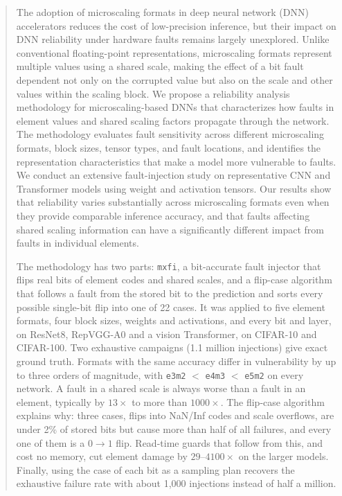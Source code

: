 \documentclass[12pt,a4paper]{article}
\newcommand{\fmt}[1]{\texttt{#1}}
\begin{document}
\newpage
\begin{abstract}
\noindent
The adoption of microscaling formats in deep neural network (DNN) accelerators reduces the
cost of low-precision inference, but their impact on DNN reliability under hardware faults
remains largely unexplored. Unlike conventional floating-point representations, microscaling
formats represent multiple values using a shared scale, making the effect of a bit fault
dependent not only on the corrupted value but also on the scale and other values within the
scaling block. We propose a reliability analysis methodology for microscaling-based DNNs that
characterizes how faults in element values and shared scaling factors propagate through the
network. The methodology evaluates fault sensitivity across different microscaling formats,
block sizes, tensor types, and fault locations, and identifies the representation
characteristics that make a model more vulnerable to faults. We conduct an extensive
fault-injection study on representative CNN and Transformer models using weight and activation
tensors. Our results show that reliability varies substantially across microscaling formats
even when they provide comparable inference accuracy, and that faults affecting shared scaling
information can have a significantly different impact from faults in individual elements.

The methodology has two parts: \texttt{mxfi}, a bit-accurate fault injector that flips real
bits of element codes and shared scales, and a flip-case algorithm that follows a fault from
the stored bit to the prediction and sorts every possible single-bit flip into one of 22 cases.
It was applied to five element formats, four block sizes, weights and activations, and every
bit and layer, on ResNet8, RepVGG-A0 and a vision Transformer, on CIFAR-10 and CIFAR-100. Two
exhaustive campaigns (1.1 million injections) give exact ground truth. Formats with the same accuracy differ in
vulnerability by up to three orders of magnitude, with \fmt{e3m2} $<$ \fmt{e4m3} $<$ \fmt{e5m2}
on every network. A fault in a shared scale is always worse than a fault in an element,
typically by $13\times$ to more than $1000\times$. The flip-case algorithm explains why: three
cases, flips into NaN/Inf codes and scale overflows, are under 2\% of stored bits but cause more
than half of all failures, and every one of them is a $0\to1$ flip. Read-time guards that
follow from this, and cost no memory, cut element damage by $29$--$4100\times$ on the larger
models. Finally, using the case of each bit as a sampling plan recovers the exhaustive failure
rate with about 1,000 injections instead of half a million.
\end{abstract}
\end{document}
